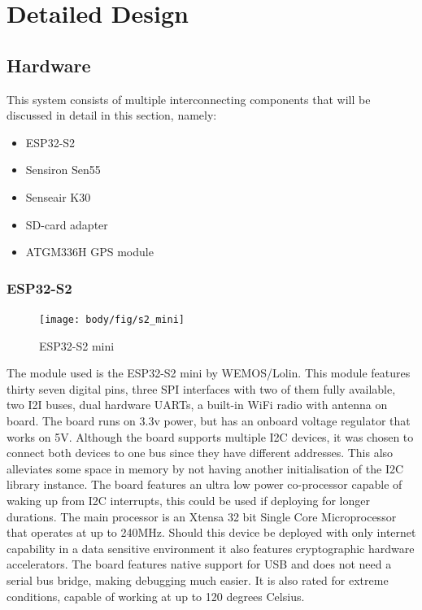 \chapter{Detailed Design}
\vspace{-2em}
\section{Hardware}


This system consists of multiple interconnecting components that will be discussed in detail in this section, namely:
\begin{itemize}
	\item ESP32-S2
	\item Sensiron Sen55
	\item Senseair K30
	\item SD-card adapter
	\item ATGM336H GPS module	
\end{itemize} 




\subsection{ESP32-S2}

\begin{figure}[!htb]
	\centering
	\texttt{[image: body/fig/s2\_mini]}
	\caption{ESP32-S2 mini}
	\label{fig:s2mini}
\end{figure}


\noindent
The module used is the ESP32-S2 mini by WEMOS/Lolin. This module features thirty seven digital pins, three SPI interfaces with two of them fully available, two I2I buses, dual hardware UARTs, a built-in WiFi radio with antenna on board. The board runs on 3.3v power, but has an onboard voltage regulator that works on 5V. Although the board supports multiple I2C devices, it was chosen to connect both devices to one bus since they have different addresses. This also alleviates some space in memory by not having another initialisation of the I2C library instance. The board features an ultra low power co-processor capable of waking up from I2C interrupts, this could be used if deploying for longer durations. The main processor is an {Xtensa\textregistered}  32 bit Single Core Microprocessor that operates at up to 240MHz. Should this device be deployed with only internet capability in a data sensitive environment it also features cryptographic hardware accelerators. The board features native support for USB and does not need a serial bus bridge, making debugging much easier. It is also rated for extreme conditions, capable of working at up to 120 degrees Celsius\cite{wemos2021s2mini}.


